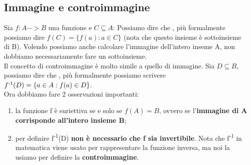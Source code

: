 	\subsection{Immagine e controimmagine}
		Sia $f:A->B$ una funzione e $C\subseteq A$:
		Possiamo dire che , più formalmente possiamo dire $f(C)=\{f(a):a\in C\}$ (nota che questo insieme è sottoinsieme di B). Volendo possiamo anche calcolare l'immagine dell'intero inseme A, non dobbiamo necessariamente fare un sottoinsieme.
		\medskip\\
		Il concetto di controimmagine è molto simile a quello di immagine. Sia $D\subseteq B$, possiamo dire che , più formalmente possiamo scrivere $f\textsuperscript{-1}(D)=\{a\in A:f(a)\in D\}$.
		\medskip\\
		Ora dobbiamo fare 2 osservazioni importanti:
		\begin{enumerate}
			\item la funzione f è suriettiva se e solo se $f(A)=B$, ovvero se l'\textbf{immagine di A corrisponde all'intero insieme B};
			\item per definire f\textsuperscript{-1}(D) \textbf{non è necessario che f sia invertibile}. Nota che f\textsuperscript{-1} in matematica viene usato per rappresentare la funzione inversa, ma noi la usiamo per definire la \textbf{controimmagine}.
		\end{enumerate}